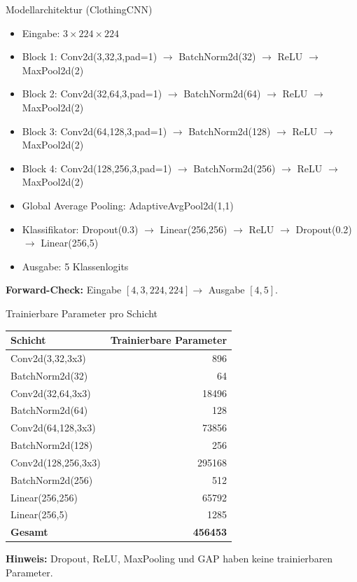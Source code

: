 \documentclass{beamer}
\begin{document}
\begin{frame}{Modellarchitektur (ClothingCNN)}
\small
\begin{itemize}
    \item Eingabe: $3 \times 224 \times 224$
    \item Block 1: Conv2d(3,32,3,pad=1) $\rightarrow$ BatchNorm2d(32) $\rightarrow$ ReLU $\rightarrow$ MaxPool2d(2)
    \item Block 2: Conv2d(32,64,3,pad=1) $\rightarrow$ BatchNorm2d(64) $\rightarrow$ ReLU $\rightarrow$ MaxPool2d(2)
    \item Block 3: Conv2d(64,128,3,pad=1) $\rightarrow$ BatchNorm2d(128) $\rightarrow$ ReLU $\rightarrow$ MaxPool2d(2)
    \item Block 4: Conv2d(128,256,3,pad=1) $\rightarrow$ BatchNorm2d(256) $\rightarrow$ ReLU $\rightarrow$ MaxPool2d(2)
    \item Global Average Pooling: AdaptiveAvgPool2d(1,1)
    \item Klassifikator: Dropout(0.3) $\rightarrow$ Linear(256,256) $\rightarrow$ ReLU $\rightarrow$ Dropout(0.2) $\rightarrow$ Linear(256,5)
    \item Ausgabe: 5 Klassenlogits
\end{itemize}

\textbf{Forward-Check:} Eingabe $[4,3,224,224] \rightarrow$ Ausgabe $[4,5]$.
\end{frame}

\begin{frame}{Trainierbare Parameter pro Schicht}
\scriptsize
\begin{table}[h]
\centering
\begin{tabular}{l r}
\toprule
\textbf{Schicht} & \textbf{Trainierbare Parameter} \\
\midrule
Conv2d(3,32,3x3) & 896 \\
BatchNorm2d(32) & 64 \\
Conv2d(32,64,3x3) & 18496 \\
BatchNorm2d(64) & 128 \\
Conv2d(64,128,3x3) & 73856 \\
BatchNorm2d(128) & 256 \\
Conv2d(128,256,3x3) & 295168 \\
BatchNorm2d(256) & 512 \\
Linear(256,256) & 65792 \\
Linear(256,5) & 1285 \\
\midrule
\textbf{Gesamt} & \textbf{456453} \\
\bottomrule
\end{tabular}
\end{table}

\textbf{Hinweis:} Dropout, ReLU, MaxPooling und GAP haben keine trainierbaren Parameter.
\end{frame}
\end{document}
